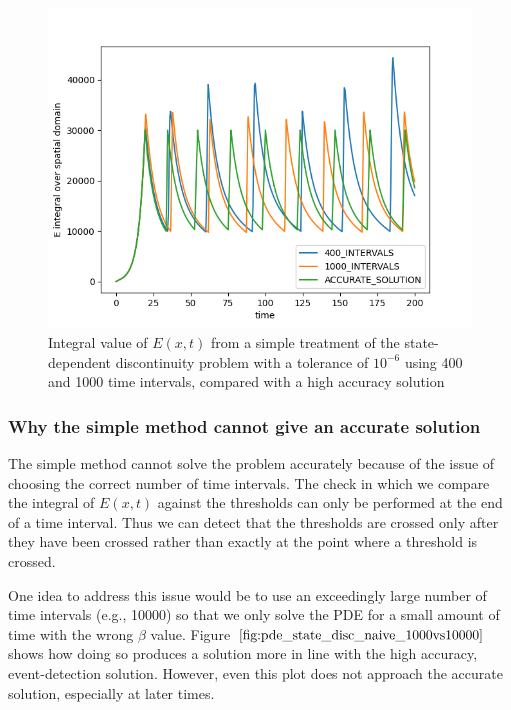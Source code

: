 \documentclass{article}
\begin{document}
\begin{figure}[H]
\centering
\includegraphics[width=0.7\linewidth]{./figures/pde_state_disc_naive_400vs1000}
\caption{Integral value of $E(x, t)$ from a simple treatment of the state-dependent discontinuity problem with a tolerance of $10^{-6}$ using 400 and 1000 time intervals, compared with a high accuracy solution}
\label{fig:pde_state_disc_naive_400vs1000}
\end{figure}

\subsubsection{Why the simple method cannot give an accurate solution}
\label{subsubsection:pde_state_naive_always_inaccurate}
The simple method cannot solve the problem accurately because of the issue of choosing the correct number of time intervals. The check in which we compare the integral of $E(x, t)$ against the thresholds can only be performed at the end of a time interval. Thus we can detect that the thresholds are crossed only after they have been crossed rather than exactly at the point where a threshold is crossed.

One idea to address this issue would be to use an exceedingly large number of time intervals (e.g., 10000) so that we only solve the PDE for a small amount of time with the wrong $\beta$ value. Figure $\ref{fig:pde_state_disc_naive_1000vs10000}$ shows how doing so produces a solution more in line with the high accuracy, event-detection solution. However, even this plot does not approach the accurate solution, especially at later times. 
\end{document}
